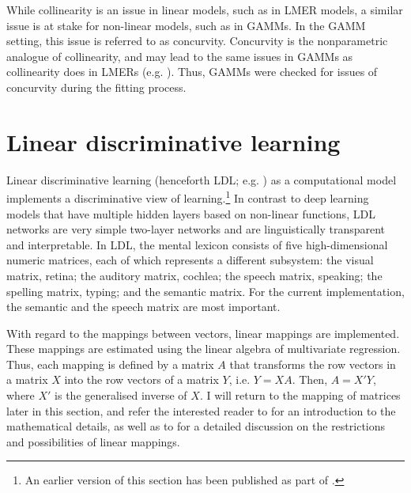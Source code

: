 While collinearity is an issue in linear models, such as in LMER models, a similar issue is at stake for non-linear models, such as in GAMMs. In the GAMM setting, this issue is referred to as concurvity. Concurvity is the nonparametric analogue of collinearity, and may lead to the same issues in GAMMs as collinearity does in LMERs (e.g. \cite{Ramsay2003}). Thus, GAMMs were checked for issues of concurvity during the fitting process.

\section{Linear discriminative learning}\label{section03_3}

Linear discriminative learning (henceforth LDL; e.g. \cite{Baayen2019}) as a computational model implements a discriminative view of learning.\footnote{An earlier version of this section has been published as part of \citet{Schmitz2021b}.} In contrast to deep learning models that have multiple hidden layers based on non-linear functions, LDL networks are very simple two-layer networks and are linguistically transparent and interpretable. In LDL, the mental lexicon consists of five high-dimensional numeric matrices, each of which represents a different subsystem: the visual matrix, retina; the auditory matrix, cochlea; the speech matrix, speaking; the spelling matrix, typing; and the semantic matrix. For the current implementation, the semantic and the speech matrix are most important. 

With regard to the mappings between vectors, linear mappings are implemented. These mappings are estimated using the linear algebra of multivariate regression. Thus, each mapping is defined by a matrix $A$ that transforms the row vectors in a matrix $X$ into the row vectors of a matrix $Y$, i.e. $Y=XA$. Then, $A=X'Y$, where $X'$ is the generalised inverse of $X$. I will return to the mapping of matrices later in this section, and refer the interested reader to \citet{Baayen2019} for an introduction to the mathematical details, as well as to \citet{Milin2017Feldman} for a detailed discussion on the restrictions and possibilities of linear mappings.

